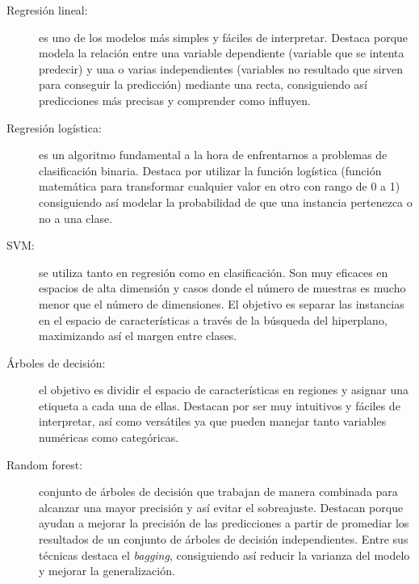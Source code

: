 	\begin{description}
		\item[Regresión lineal:] es uno de los modelos más simples y fáciles de interpretar. Destaca porque modela la relación entre una variable dependiente (variable que se intenta predecir) y una o varias independientes (variables no resultado que sirven para conseguir la predicción) mediante una recta, consiguiendo así predicciones más precisas y comprender como influyen.
		\item[Regresión logística:] es un algoritmo fundamental a la hora de enfrentarnos a problemas de clasificación binaria. Destaca por utilizar la función logística (función matemática para transformar cualquier valor en otro con rango de 0 a 1) consiguiendo así modelar la probabilidad de que una instancia pertenezca o no a una clase.
		\item[SVM:] se utiliza tanto en regresión como en clasificación. Son muy eficaces en espacios de alta dimensión y casos donde el número de muestras es mucho menor que el número de dimensiones. El objetivo es separar las instancias en el espacio de características a través de la búsqueda del hiperplano, maximizando así el margen entre clases.
		\item[Árboles de decisión:] el objetivo es dividir el espacio de características en regiones y asignar una etiqueta a cada una de ellas. Destacan por ser muy intuitivos y fáciles de interpretar, así como versátiles ya que pueden manejar tanto variables numéricas como categóricas.
		\item[Random forest:] conjunto de árboles de decisión que trabajan de manera combinada para alcanzar una mayor precisión y así evitar el sobreajuste. Destacan porque ayudan a mejorar la precisión de las predicciones a partir de promediar los resultados de un conjunto de árboles de decisión independientes. Entre sus técnicas destaca el \emph{bagging}, consiguiendo así reducir la varianza del modelo y mejorar la generalización.
	\end{description}


